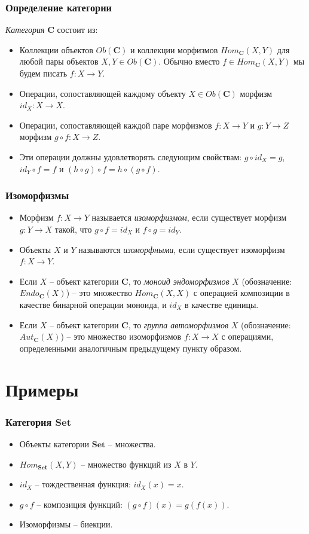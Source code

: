 \documentclass{beamer}
\newcommand{\cat}[1]{\mathbf{#1}}
\renewcommand{\C}{\cat{C}}
\newcommand{\Set}{\cat{Set}}
\begin{document}
\begin{frame}
\frametitle{Определение категории}
\emph{Категория} $\C$ состоит из:
\begin{itemize}
\item Коллекции объектов $Ob(\C)$ и коллекции морфизмов $Hom_\C(X, Y)$ для любой пары объектов $X, Y \in Ob(\C)$.
    Обычно вместо $f \in Hom_\C(X, Y)$ мы будем писать $f : X \to Y$.
\item Операции, сопоставляющей каждому объекту $X \in Ob(\C)$ морфизм $id_X : X \to X$.
\item Операции, сопоставляющей каждой паре морфизмов $f : X \to Y$ и $g : Y \to Z$ морфизм $g \circ f : X \to Z$.
\item Эти операции должны удовлетворять следующим свойствам: $g \circ id_X = g$, $id_Y \circ f = f$ и $(h \circ g) \circ f = h \circ (g \circ f)$.
\end{itemize}
\end{frame}

\begin{frame}
\frametitle{Изоморфизмы}
\begin{itemize}
\item Морфизм $f : X \to Y$ называется \emph{изоморфизмом}, если существует морфизм $g : Y \to X$ такой, что $g \circ f = id_X$ и $f \circ g = id_Y$.
\item Объекты $X$ и $Y$ называются \emph{изоморфными}, если существует изоморфизм $f : X \to Y$.
\item Если $X$ -- объект категории $\C$, то \emph{моноид эндоморфизмов} $X$ (обозначение: $Endo_\C(X)$) -- это множество $Hom_\C(X, X)$ с операцией композиции в качестве бинарной операции моноида, и $id_X$ в качестве единицы.
\item Если $X$ -- объект категории $\C$, то \emph{группа автоморфизмов} $X$ (обозначение: $Aut_\C(X)$) -- это множество изоморфизмов $f : X \to X$ с операциями, определенными аналогичным предыдущему пункту образом.
\end{itemize}
\end{frame}

\section{Примеры}

\begin{frame}
\frametitle{Категория $\Set$}
\begin{itemize}
\item Объекты категории $\Set$ -- множества.
\item $Hom_\Set(X, Y)$ -- множество функций из $X$ в $Y$.
\item $id_X$ -- тождественная функция: $id_X(x) = x$.
\item $g \circ f$ -- композиция функций: $(g \circ f)(x) = g(f(x))$.
\item Изоморфизмы -- биекции.
\end{itemize}
\end{frame}
\end{document}
